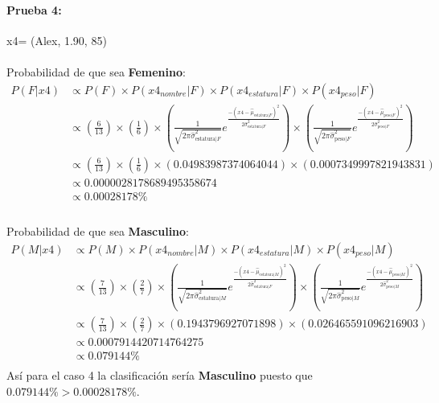 \documentclass[12pt]{article}
\begin{document}
 \paragraph{Prueba 4: }x4= (Alex, 1.90, 85)
 \paragraph{}Probabilidad de que sea \textbf{Femenino}:\\
 \begin{equation}
 \begin{split}
 P(F|x4) &\propto P(F) \times P(x4_{nombre}|F) \times P(x4_{estatura}|F) \times P(x4_{peso}|F) \\
 &\propto (\frac{6}{13}) \times (\frac{1}{6}) \times (\frac{1}{\sqrt{2\pi\hat{\sigma}_{\text{estatura}|F}^2}}e^{\frac{-(x4 - \hat{\mu}_{\text{estatura}|F})^2}{2\hat{\sigma}_{\text{estatura}|F}^2}}) \times (\frac{1}{\sqrt{2\pi\hat{\sigma}_{\text{peso}|F}^2}}e^{\frac{-(x4 - \hat{\mu}_{\text{peso}|F})^2}{2\hat{\sigma}_{\text{peso}|F}^2}}) \\
 &\propto (\frac{6}{13}) \times (\frac{1}{6}) \times (0.04983987374064044) \times (0.0007349997821943831) \\
 &\propto 0.0000028178689495358674 \\
 &\propto 0.00028178\% \\
 \end{split}
 \end{equation}
 \paragraph{}Probabilidad de que sea \textbf{Masculino}:\\
 \begin{equation}
 \begin{split}
 P(M|x4) &\propto P(M) \times P(x4_{nombre}|M) \times P(x4_{estatura}|M) \times P(x4_{peso}|M) \\
 &\propto (\frac{7}{13}) \times (\frac{2}{7}) \times (\frac{1}{\sqrt{2\pi\hat{\sigma}_{\text{estatura}|M}^2}}e^{\frac{-(x4 - \hat{\mu}_{\text{estatura}|M})^2}{2\hat{\sigma}_{\text{estatura}|F}^2}}) \times (\frac{1}{\sqrt{2\pi\hat{\sigma}_{\text{peso}|M}^2}}e^{\frac{-(x4 - \hat{\mu}_{\text{peso}|M})^2}{2\hat{\sigma}_{\text{peso}|M}^2}}) \\
 &\propto (\frac{7}{13}) \times (\frac{2}{7}) \times (0.1943796927071898) \times (0.026465591096216903) \\
 &\propto 0.0007914420714764275 \\
 &\propto 0.079144 \% \\
 \end{split}
 \end{equation}
 Así para el caso 4 la clasificación sería \textbf{Masculino} puesto que $0.079144\% > 0.00028178\%$.\\
 \clearpage
 \pagebreak
\end{document}
